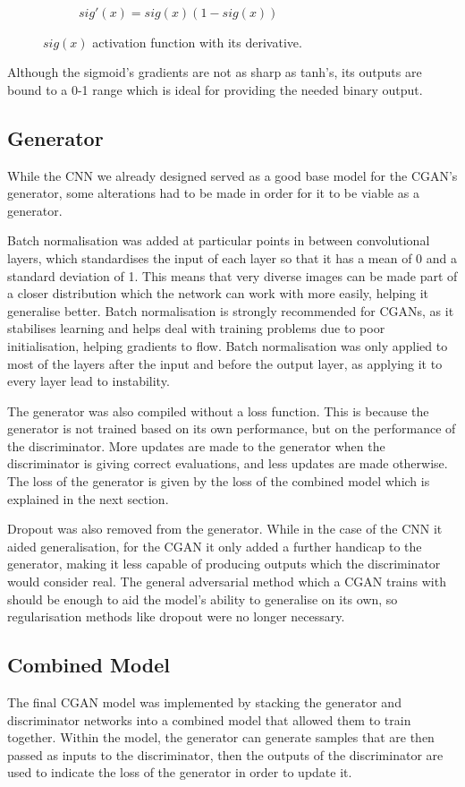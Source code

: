 \documentclass{l4proj}
\begin{document}
\begin{figure}[H]
\begin{subfigure}[b]{0.4\textwidth}
        \caption{$sig'(x) = sig(x)(1-sig(x))$} 
    \end{subfigure} 
    \caption{$sig(x)$ activation function with its derivative.}
\end{figure}

Although the sigmoid's gradients are not as sharp as tanh's, its outputs are bound to a 0-1 range which is ideal for providing the needed binary output.

\subsection{Generator}
While the CNN we already designed served as a good base model for the CGAN's generator, some alterations had to be made in order for it to be viable as a generator.

Batch normalisation was added at particular points in between convolutional layers, which standardises the input of each layer so that it has a mean of 0 and a standard deviation of 1. This means that very diverse images can be made part of a closer distribution which the network can work with more easily, helping it generalise better. Batch normalisation is strongly recommended for CGANs\cite{DCGAN}, as it stabilises learning and helps deal with training problems due to poor initialisation, helping gradients to flow. Batch normalisation was only applied to most of the layers after the input and before the output layer, as applying it to every layer lead to instability.

The generator was also compiled without a loss function. This is because the generator is not trained based on its own performance, but on the performance of the discriminator. More updates are made to the generator when the discriminator is giving correct evaluations, and less updates are made otherwise. The loss of the generator is given by the loss of the combined model which is explained in the next section.

Dropout was also removed from the generator. While in the case of the CNN it aided generalisation, for the CGAN it only added a further handicap to the generator, making it less capable of producing outputs which the discriminator would consider real. The general adversarial method which a CGAN trains with should be enough to aid the model's ability to generalise on its own, so regularisation methods like dropout were no longer necessary.

\subsection{Combined Model}
The final CGAN model was implemented by stacking the generator and discriminator networks into a combined model that allowed them to train together. Within the model, the generator can generate samples that are then passed as inputs to the discriminator, then the outputs of the discriminator are used to indicate the loss of the generator in order to update it. 
\end{document}
